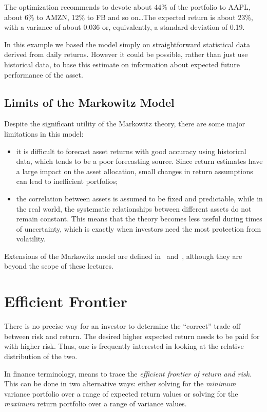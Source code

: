 The optimization recommends to devote about 44\% of the portfolio to AAPL, about 6\% to AMZN, 12\% to FB and so on\ldots The expected return is about 23\%, with a variance of about 0.036 or, equivalently, a standard deviation of 0.19.

In this example we based the model simply on straightforward statistical data derived from daily returns. However it could be possible, rather than just use historical data, to base this estimate on information about expected future performance of the asset.

\subsection{Limits of the Markowitz Model}
\label{limits-of-the-markowitz-model}

Despite the significant utility of the Markowitz theory, there are some major limitations in this model:

\begin{itemize}
\tightlist
\item
	it is difficult to forecast asset returns with good accuracy using historical data, which tends to be a poor forecasting source. Since return estimates have a large impact on the asset allocation, small changes in return assumptions can lead to inefficient portfolios;
	\item 
	the correlation between assets is assumed to be fixed and predictable, while in the real world, the systematic relationships between different assets 	do not remain constant. This means that the theory becomes less useful during times of uncertainty, which is exactly when investors need the most protection from volatility.
\end{itemize}

Extensions of the Markowitz model are defined in~\cite{bib:post_modern_theory} and~\cite{bib:black_litterman}, although they are beyond the scope of these lectures. 

\section{Efficient Frontier}
\label{efficient-frontier}
There is no precise way for an investor to determine the “correct” trade off between risk and return. The desired higher expected return needs to be paid for with higher risk. Thus, one is frequently interested in looking at the relative distribution of the two.

In finance terminology, means to trace the \emph{efficient frontier of return and risk}. This can be done in two alternative ways: either solving for the \emph{minimum} variance portfolio over a range of expected return values or solving for the \emph{maximum} return portfolio over a range of variance values.

